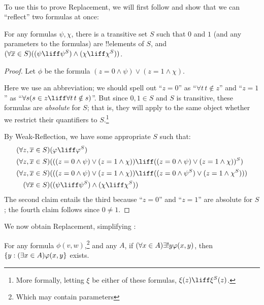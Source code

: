 \documentclass[../../../include/open-logic-section]{subfiles}
\begin{document}
\
\\
To use this to prove Replacement, we will first follow \citet[first
part of Theorem 2]{Levy1960} and show that we can ``reflect'' two
formulas at once:

\begin{lem}[in $\Z + \text{Weak-Reflection}$.]
For any formulas $\psi, \chi$, there is a transitive set $S$ such that $0$ and $1$ (and any parameters to the formulas) are !!{element}s of $S$, and $(\forall \overline{x} \in S)((\psi \liff \psi^S) \land (\chi \liff \chi^S))$.
\end{lem}

\begin{proof}
Let $\phi$ be the formula $(z = 0 \land \psi) \lor (z = 1 \land \chi)$. 

Here we use an abbreviation; we should spell out ``$z = 0$'' as
``$\forall t\, t \notin z$'' and ``$z =1$'' as ``$\forall s(s \in z
\liff \forall t\, t \notin s)$''. But since $0, 1 \in S$ and $S$ is
transitive, these formulas are \emph{absolute} for $S$; that is, they
will apply to the same object whether we restrict their quantifiers to
$S$.\footnote{More formally, letting $\xi$ be either of these
formulas, $\xi(z) \liff \xi^S(z)$.}

By Weak-Reflection, we have some appropriate $S$ such that:
\begin{align*}
	(\forall z, \overline{x} \in S)(&\phi \liff \phi^S)\\
	(\forall z, \overline{x} \in S)(&((z = 0 \land \psi) \lor (z = 1 \land \chi)) \liff 
	((z = 0 \land \psi) \lor (z = 1 \land \chi))^S)\\
	(\forall z, \overline{x} \in S)(&((z = 0 \land \psi) \lor (z = 1 \land \chi))\liff ((z = 0 \land \psi^S) \lor (z = 1 \land \chi^S)))\\
	(\forall \overline{x} \in S)(&(\psi \liff \psi^S) \land (\chi \liff \chi^S))
\end{align*}
The second claim entails the third because ``$z = 0$'' and ``$z=1$''
are absolute for $S$; the fourth claim follows since $0 \neq 1$.
\end{proof}\noindent We now obtain Replacement, simplifying
\citet[Theorem 6]{Levy1960}:

\begin{thm}\label{thm:replacement} 
For any formula $\phi(v,w)$,\footnote{Which may contain parameters}
and any $A$, if $(\forall x \in A)\exists \bang  y\phi(x,y)$, then
$\{ y : (\exists x \in A)\varphi(x,y \}$ exists.
\end{thm}
\end{document}

